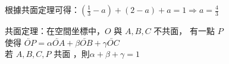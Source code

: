 \begin{QUESTION}
\begin{QSOLLIST}
\begin{QSOL}
			   根據共面定理可得：$(\frac{1}{3} - a) + (2-a) +a = 1 \Rightarrow a = \frac{4}{3} $\\
			   
			   	   \begin{minipage}[c]{14cm}
					   共面定理：在空間坐標中，$O$ 與 $A,B,C$ 不共面， 有一點 $P$ \\
					   使得 $\lvec{OP} = \alpha \lvec{OA} +\beta \lvec{OB} +\gamma \lvec{OC} $ \\
					   若 $A,B,C,P$ 共面 ，則$\alpha+\beta+\gamma = 1$
					\end{minipage}
				
			\end{QSOL}

        \end{QSOLLIST}
        \begin{QEMPTYSPACE}
        \end{QEMPTYSPACE}
    \end{QUESTION}
